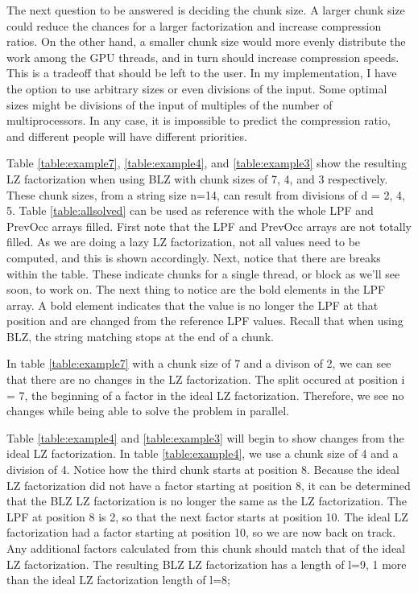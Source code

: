 The next question to be answered is deciding the chunk size. 
A larger chunk size could reduce the chances for a larger factorization and increase compression ratios.
On the other hand, a smaller chunk size would more evenly distribute the work among the GPU threads, and in turn should increase compression speeds.
This is a tradeoff that should be left to the user.
In my implementation, I have the option to use arbitrary sizes or even divisions of the input.
Some optimal sizes might be divisions of the input of multiples of the number of multiprocessors.
In any case, it is impossible to predict the compression ratio, and different people will have different priorities.

Table \ref{table:example7}, \ref{table:example4}, and \ref{table:example3} show the resulting LZ factorization when using BLZ with chunk sizes of 7, 4, and 3 respectively. 
These chunk sizes, from a string size n=14, can result from divisions of d = 2, 4, 5.
Table \ref{table:allsolved} can be used as reference with the whole LPF and PrevOcc arrays filled.
First note that the LPF and PrevOcc arrays are not totally filled.
As we are doing a lazy LZ factorization, not all values need to be computed, and this is shown accordingly.
Next, notice that there are breaks within the table.
These indicate chunks for a single thread, or block as we'll see soon, to work on.
The next thing to notice are the bold elements in the LPF array.
A bold element indicates that the value is no longer the LPF at that position and are changed from the reference LPF values.
Recall that when using BLZ, the string matching stops at the end of a chunk.

In table \ref{table:example7} with a chunk size of 7 and a divison of 2, we can see that there are no changes in the LZ factorization.
The split occured at position i = 7, the beginning of a factor in the ideal LZ factorization.
Therefore, we see no changes while being able to solve the problem in parallel.

Table \ref{table:example4} and \ref{table:example3} will begin to show changes from the ideal LZ factorization.
In table \ref{table:example4}, we use a chunk size of 4 and a division of 4.
Notice how the third chunk starts at position 8.
Because the ideal LZ factorization did not have a factor starting at position 8, it can be determined that the BLZ LZ factorization is no longer the same as the LZ factorization.
The LPF at position 8 is 2, so that the next factor starts at position 10.
The ideal LZ factorization had a factor starting at position 10, so we are now back on track.
Any additional factors calculated from this chunk should match that of the ideal LZ factorization.
The resulting BLZ LZ factorization has a length of l=9, 1 more than the ideal LZ factorization length of l=8;

